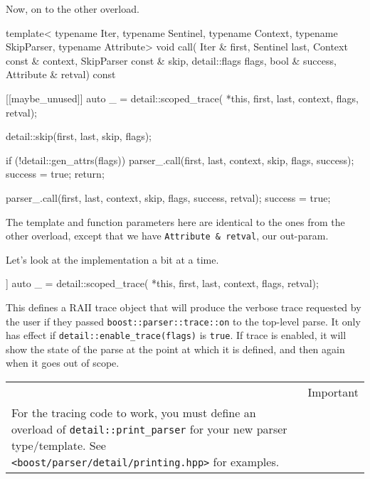 Now, on to the other overload.

\begin{code}
template<
    typename Iter,
    typename Sentinel,
    typename Context,
    typename SkipParser,
    typename Attribute>
void call(
    Iter & first,
    Sentinel last,
    Context const & context,
    SkipParser const & skip,
    detail::flags flags,
    bool & success,
    Attribute & retval) const
{
    [[maybe_unused]] auto _ = detail::scoped_trace(
        *this, first, last, context, flags, retval);

    detail::skip(first, last, skip, flags);

    if (!detail::gen_attrs(flags)) {
        parser_.call(first, last, context, skip, flags, success);
        success = true;
        return;
    }

    parser_.call(first, last, context, skip, flags, success, retval);
    success = true;
}
\end{code}

The template and function parameters here are identical to the ones from the other overload, except that we have \texttt{Attribute \& retval}, our out-param.

Let's look at the implementation a bit at a time.

\begin{code}
[[maybe_unused]] auto _ = detail::scoped_trace(
    *this, first, last, context, flags, retval);
\end{code}

This defines a RAII trace object that will produce the verbose trace requested by the user if they passed \texttt{boost::parser::trace::on} to the top-level parse. It only has effect if \texttt{detail::enable\_trace(flags)} is \texttt{true}. If trace is enabled, it will show the state of the parse at the point at which it is defined, and then again when it goes out of scope.

\begin{longtable}[]{@{}
  >{\raggedright\arraybackslash}p{}
  >{\raggedright\arraybackslash}p{}@{}}
\toprule\noalign{}
\endhead
\bottomrule\noalign{}
\endlastfoot
\begin{minipage}[t]{\linewidth}\raggedright
\end{minipage} & Important \\
For the tracing code to work, you must define an overload of \texttt{detail::print\_parser} for your new parser type/template. See \texttt{<boost/parser/detail/printing.hpp>} for examples. & \\
\end{longtable}

